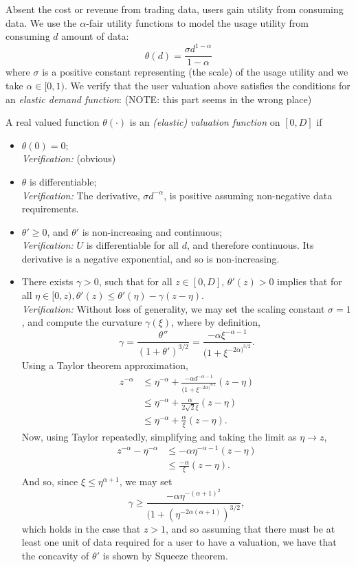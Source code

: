 \documentclass[12pt]{article}
\theoremstyle{definition}
\begin{document}
\begin{multicols}{2}
Absent the cost or revenue from trading data, users gain utility from consuming
data. We use the $\alpha$-fair utility functions \cite{tuffin} to model the
usage utility from consuming $d$ amount of data:
\begin{equation}
    \theta(d) = \frac{\sigma d^{1-\alpha}}{1-\alpha}
\end{equation}
where $\sigma$ is a positive constant representing (the scale) of the usage
utility and we take $\alpha \in [0, 1)$.
We verify that the user valuation above satisfies the conditions for an
\emph{elastic demand function}: (NOTE: this part seems in the wrong place)

A real valued function $\theta(\cdot)$ is an \emph{(elastic) valuation
function} on $[0, D]$ if 
\begin{itemize}
    \item $\theta(0) = 0$; \\
        \emph{Verification:} (obvious)
    \item $\theta$ is differentiable; \\
        \emph{Verification:} The derivative, $\sigma d^{-\alpha}$, is positive assuming non-negative
data requirements.
    \item $\theta ' \ge 0$, and $\theta '$ is non-increasing and continuous; \\
        \emph{Verification:} $U$ is differentiable for all $d$, and therefore
continuous. Its derivative is a negative exponential, and so is non-increasing.
    \item There exists $\gamma > 0$, such that for all $z \in [0,D]$, $\theta
'(z) > 0$ implies that for all $\eta \in [0, z), \theta '(z) \le \theta '(\eta)
- \gamma(z - \eta)$. \\
        \emph{Verification:} Without loss of generality, we may set the scaling
constant $\sigma=1$, and compute the curvature $\gamma(\xi)$, where by definition,
$$
    \gamma = \frac{\theta''}{(1+\theta')^{3/2}} = \frac{-\alpha
\xi^{-\alpha-1}}{(1+\xi^{-2\alpha)^{3/2}}}.
$$
Using a Taylor theorem approximation,
\begin{align*}
    z^{-\alpha} &\le \eta^{-\alpha} + \frac{-\alpha
d^{-\alpha-1}}{(1+\xi^{-2\alpha)^{3/2}}}(z-\eta) \\
    & \le \eta^{-\alpha} +
\frac{\alpha}{2\sqrt{2} \xi}(z-\eta)  \\
    &\le \eta^{-\alpha} +
\frac{\alpha}{\xi}(z-\eta).
\end{align*}
Now, using Taylor repeatedly, simplifying and taking the limit as $\eta \rightarrow z$,
\begin{align*}
    z^{-\alpha} - \eta^{-\alpha} &\le -\alpha\eta^{-\alpha-1}(z-\eta) \\
    & \le \frac{-\alpha}{\xi}(z-\eta).
\end{align*}
And so, since $\xi \le \eta^{\alpha+1}$,
we may set
$$
    \gamma \ge
\frac{-\alpha\eta^{-(\alpha+1)^2}}{\big(1+(\eta^{-2\alpha(\alpha+1)})^{3/2}},
$$
which holds in the case that $z > 1$, and so assuming that there must be at least one
unit of data required for a user to have
a valuation,  we have that the concavity of $\theta'$ is shown by Squeeze theorem.
\end{itemize}


\end{multicols}
\end{document}
